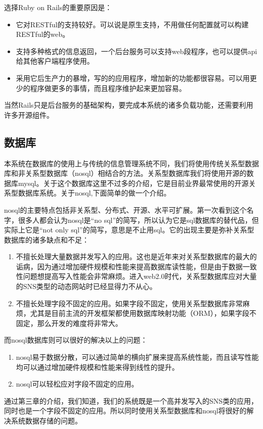 选择Ruby on Rails的重要原因是：
\begin{itemize}
\item 它对RESTful的支持较好。可以说是原生支持，不用做任何配置就可以构建RESTful的web。
\item 支持多种格式的信息返回，一个后台服务可以支持web段程序，也可以提供api给其他客户端程序使用。
\item 采用它后生产力的暴增，写的的应用程序，增加新的功能都很容易。可以用更少的程序做更多的事情，而且程序维护起来更加容易。
\end{itemize}

当然Rails只是后台服务的基础架构，要完成本系统的诸多负载功能，还需要利用许多开源组件。

\subsection{数据库}
\label{sec:database}

本系统在数据库的使用上与传统的信息管理系统不同，我们将使用传统关系型数据库和非关系型数据库（nosql）相结合的方法。关系型数据库我们将使用开源的数据库mysql\cite{dubois2003mysql}。关于这个数据库这里不过多的介绍，它是目前业界最常使用的开源关系型数据库系统。关于nosql,下面简单的做一个介绍。

nosql的主要特点包括非关系型、分布式、开源、水平可扩展。第一次看到这个名字，很多人都会认为nosql\cite{tiwari2011professional,strauch2011nosql,membrey2010definitive}是“no sql”的简写，所以认为它是sql数据库的替代品，但实际上它是“not only sql”的简写，意思是不止用sql。它的出现主要是弥补关系型数据库的诸多缺点和不足：
\begin{enumerate}
\item 不擅长处理大量数据并发写入的应用。这也是近年来对关系型数据库的最大的诟病，因为通过增加硬件规模和性能来提高数据库读性能，但是由于数据一致性问题想提高写入性能会非常麻烦。进入web2.0时代，关系型数据库应对大量的SNS类型的动态网站时已经显得力不从心。
\item 不擅长处理字段不固定的应用。如果字段不固定，使用关系型数据库非常麻烦，尤其是目前主流的开发框架都使用数据库映射功能（ORM），如果字段不固定，那么开发的难度将非常大。
\end{enumerate}
而nosql数据库则可以很好的解决以上的问题：
\begin{enumerate}
\item nosql易于数据分散，可以通过简单的横向扩展来提高系统性能，而且读写性能均可以通过增加硬件规模和性能来得到线性的提升。
\item nosql可以轻松应对字段不固定的应用。
\end{enumerate}
通过第三章的介绍，我们知道，我们的系统既是一个高并发写入的SNS类的应用，同时也是一个字段不固定的应用。所以同时使用关系型数据库和nosql将很好的解决系统数据存储的问题。


